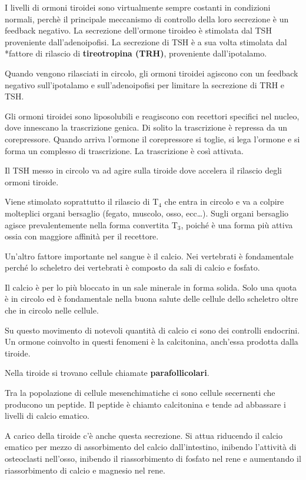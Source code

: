 \documentclass[]{article}
\begin{document}
I livelli di ormoni tiroidei sono virtualmente sempre costanti in
condizioni normali, perchè il principale meccanismo di controllo della
loro secrezione è un feedback negativo. La secrezione dell'ormone
tiroideo è stimolata dal TSH proveniente dall'adenoipofisi. La
secrezione di TSH è a sua volta stimolata dal *fattore di rilascio di
\textbf{tireotropina (TRH)}, proveniente dall'ipotalamo.

Quando vengono rilasciati in circolo, gli ormoni tiroidei agiscono con
un feedback negativo sull'ipotalamo e sull'adenoipofisi per limitare la
secrezione di TRH e TSH.

Gli ormoni tiroidei sono liposolubili e reagiscono con recettori
specifici nel nucleo, dove innescano la trascrizione genica. Di solito
la trascrizione è repressa da un corepressore. Quando arriva l'ormone il
corepressore si toglie, si lega l'ormone e si forma un complesso di
trascrizione. La trascrizione è così attivata.

Il TSH messo in circolo va ad agire sulla tiroide dove accelera il
rilascio degli ormoni tiroide.

Viene stimolato soprattutto il rilascio di T\(_4\) che entra in circolo
e va a colpire molteplici organi bersaglio (fegato, muscolo, osso,
ecc\ldots{}). Sugli organi bersaglio agisce prevalentemente nella forma
convertita T\(_3\), poiché è una forma più attiva ossia con maggiore
affinità per il recettore.

Un'altro fattore importante nel sangue è il calcio. Nei vertebrati è
fondamentale perché lo scheletro dei vertebrati è composto da sali di
calcio e fosfato.

Il calcio è per lo più bloccato in un sale minerale in forma solida.
Solo una quota è in circolo ed è fondamentale nella buona salute delle
cellule dello scheletro oltre che in circolo nelle cellule.

Su questo movimento di notevoli quantità di calcio ci sono dei controlli
endocrini. Un ormone coinvolto in questi fenomeni è la calcitonina,
anch'essa prodotta dalla tiroide.

Nella tiroide si trovano cellule chiamate \textbf{parafollicolari}.

Tra la popolazione di cellule mesenchimatiche ci sono cellule secernenti
che producono un peptide. Il peptide è chiamto calcitonina e tende ad
abbassare i livelli di calcio ematico.

A carico della tiroide c'è anche questa secrezione. Si attua riducendo
il calcio ematico per mezzo di assorbimento del calcio dall'intestino,
inibendo l'attività di osteoclasti nell'osso, inibendo il riassorbimento
di fosfato nel rene e aumentando il riassorbimento di calcio e magnesio
nel rene.
\end{document}
